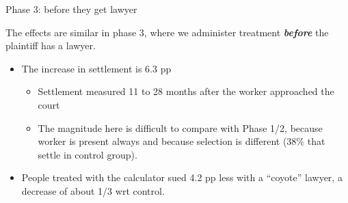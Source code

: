 \documentclass[9pt]{beamer}
\begin{document}
 
 
 \begin{frame}{Phase 3: before they get lawyer}

    \label{frame_Main_Resultsd}
    The effects are similar in phase 3, where we administer treatment \textbf{\textit{before}} the plaintiff has a lawyer.    
    \hyperlink{frame_Table3D}{}
    \begin{itemize}
        \vspace{.1in}
        \item The increase in settlement is 6.3 pp
        \vspace{.1in}
        \begin{itemize}
            \item Settlement measured 11 to 28 months after the worker approached the court
            \item The magnitude here is difficult to compare with Phase 1/2, because worker is present always and because selection is different (38\% that settle in control group).
        \end{itemize}
        \vspace{.1in}
        \item People treated with the calculator sued 4.2 pp less with a ``coyote'' lawyer, a decrease of about 1/3 wrt control. \hyperlink{law_selection}{}
    \end{itemize}
 \end{frame}
 
 
 
\end{document}
